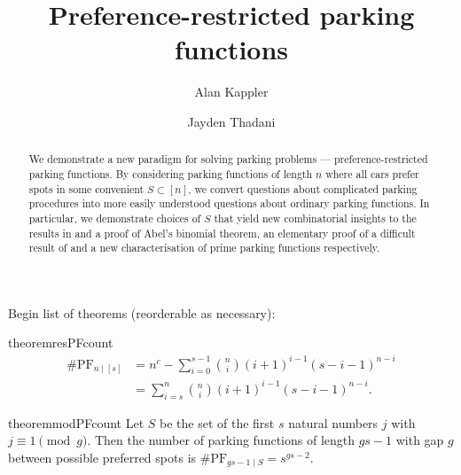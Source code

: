 \documentclass[12 pt]{amsart}
\title{Preference-restricted parking functions}
\author[Kappler]{Alan Kappler}
\author[Thadani]{Jayden Thadani}
\theoremstyle{definition} %
\theoremstyle{remark} %
\begin{document}
	

\begin{abstract}
	We demonstrate a new paradigm for solving parking problems --- preference-restricted parking functions. By considering parking functions of length $n$ where all cars prefer spots in some convenient $S \subset [n]$, we convert questions about complicated parking procedures into more easily understood questions about ordinary parking functions. In particular, we demonstrate choices of $S$ that yield new combinatorial insights to the results in \cite{cameron-johannsen-prellberg-schweitzer-2008} and a proof of Abel's binomial theorem, an elementary proof of a difficult result of \cite{blake-konheim-1977} and a new characterisation of prime parking functions respectively.
\end{abstract}

\maketitle

\pagebreak

\tableofcontents

\pagebreak

\makeatletter
\providecommand\@dotsep{5}
\makeatother
\listoftodos\relax

\pagebreak





Begin list of theorems (reorderable as necessary):

\begin{restatable}{theorem}{resPFcount}
	\label{thm:resPFcount}
	\[
		\begin{split}
			\# \mathrm{PF}_{n \mid [s]} & = n^{c} - \sum_{i = 0}^{s - 1} \binom{n}{i} (i + 1)^{i - 1} (s - i - 1)^{n - i} \\
				    & = \sum_{i = s}^{n} \binom{n}{i} (i + 1)^{i - 1} (s - i - 1)^{n - i}.
		\end{split}
	\]
\end{restatable}





\begin{restatable}{theorem}{modPFcount}
	\label{thm:modPFcount}
	Let $S$ be the set of the first $s$ natural numbers $j$ with $j \equiv 1 \pmod g$. Then the number of parking functions of length $gs - 1$ with gap $g$ between possible preferred spots is $\# \mathrm{PF}_{gs - 1 \mid S} = s^{g s - 2}$.
\end{restatable}
\end{document}
